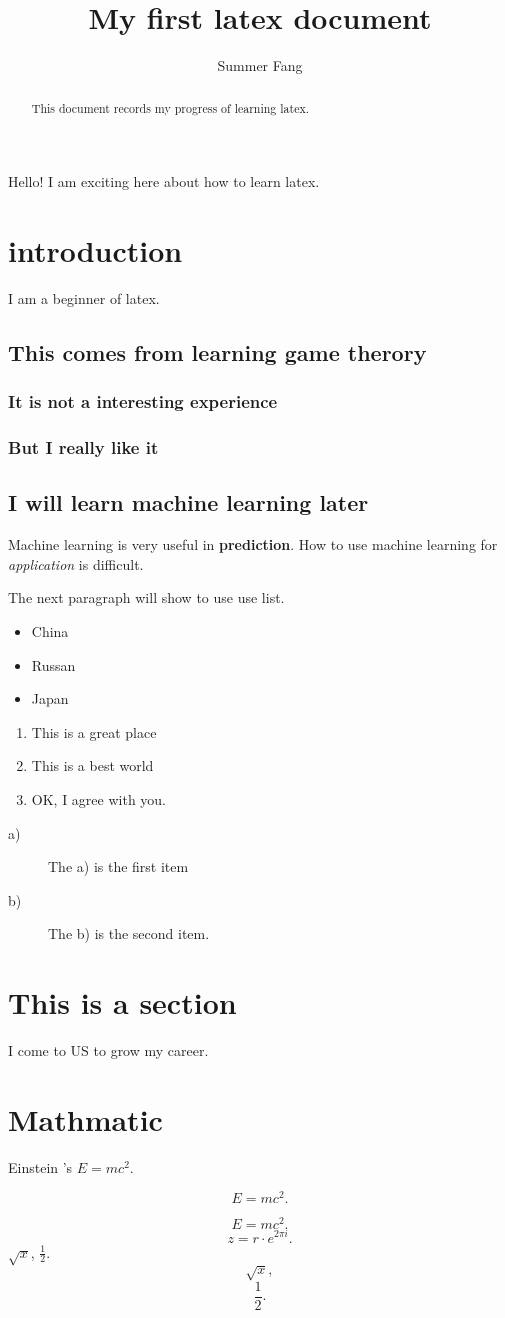 \documentclass{article}
\begin{document}
\title{My first latex document}
\author{Summer Fang}
\maketitle

\begin{abstract}
This document records my progress of learning latex.
\end{abstract}

Hello! I am exciting here about how to learn latex.

\section{introduction}
I am a beginner of latex.

\subsection{This comes from learning game therory}
\subsubsection{It is not a interesting experience}
\subsubsection{But I really like it}
\subsection{I will learn machine learning later}
Machine learning is very useful in \textbf{prediction}. How to use machine learning for \textit{application} is difficult.

The next paragraph will show to use use list.

\begin{itemize}
	\item China
	\item Russan
	\item Japan
\end{itemize}

\begin{enumerate}
	\item This is a great place
	\item This is a best world
	\item OK, I agree with you.
\end{enumerate}

\begin{description}
	\item[a)] The a) is the first item
	\item[b)] The b) is the second item.
\end{description}
\section{This is a section}
I come to US to grow my career.

\section{Mathmatic}
Einstein 's $E=mc^2$.

\[ E=mc^2. \]

\begin{equation}
E=mc^2.
\end{equation}
\[ z = r\cdot e^{2\pi i}. \]
$\sqrt{x}$, $\frac{1}{2}$.
\[ \sqrt{x}, \]
\[ \frac{1}{2}. \]
\end{document}
